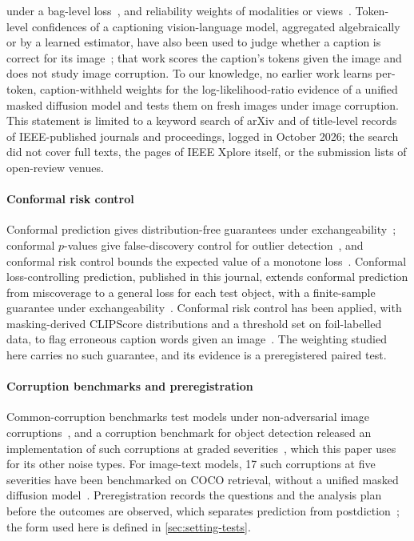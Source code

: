 under a bag-level loss~\cite{ilse2018attention}, and reliability weights of modalities or views~\cite{zhang2023provable,han2023trusted}.
Token-level confidences of a captioning vision-language model, aggregated algebraically or by a learned estimator, have also been used to
judge whether a caption is correct for its image~\cite{petryk2024token}; that work scores the caption's tokens given the image and does
not study image corruption.
To our knowledge, no earlier work learns per-token, caption-withheld weights for the log-likelihood-ratio evidence of a unified
masked diffusion model and tests them on fresh images under image corruption.
This statement is limited to a keyword search of arXiv and of title-level records of IEEE-published journals and proceedings, logged in
October 2026; the search did not cover full texts, the pages of IEEE Xplore itself, or the submission lists of open-review venues.

\paragraph*{Conformal risk control}
Conformal prediction gives distribution-free guarantees under exchangeability~\cite{vovk2005algorithmic,angelopoulos2023gentle};
conformal $p$-values give false-discovery control for outlier detection~\cite{bates2023outliers}, and conformal risk control bounds the
expected value of a monotone loss~\cite{angelopoulos2024crc}.
Conformal loss-controlling prediction, published in this journal, extends conformal prediction from miscoverage to a general loss for
each test object, with a finite-sample guarantee under exchangeability~\cite{wang2025conformal}.
Conformal risk control has been applied, with masking-derived CLIPScore distributions and a threshold set on foil-labelled data,
to flag erroneous caption words given an image~\cite{gomes2025crc}.
The weighting studied here carries no such guarantee, and its evidence is a preregistered paired test.

\paragraph*{Corruption benchmarks and preregistration}
Common-corruption benchmarks test models under non-adversarial image corruptions~\cite{hendrycks2019benchmarking}, and a
corruption benchmark for object detection released an implementation of such corruptions at graded
severities~\cite{michaelis2019imagecorruptions}, which this paper uses for its other noise types.
For image-text models, 17 such corruptions at five severities have been benchmarked on COCO retrieval, without a unified masked
diffusion model~\cite{qiu2024benchmarking}.
Preregistration records the questions and the analysis plan before the outcomes are observed, which separates prediction from
postdiction~\cite{nosek2018preregistration}; the form used here is defined in \cref{sec:setting-tests}.
